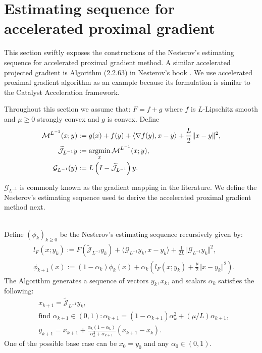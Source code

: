 \documentclass[12pt]{article}
\begin{document}
\section{Estimating sequence for accelerated proximal gradient}
    This section swiftly exposes the constructions of the Nesterov's estimating sequence for accelerated proximal gradient method. A similar accelerated projected gradient is Algorithm (2.2.63) in Nesterov's book \cite{nesterov_lectures_2018}. 
    We use accelerated proximal gradient algorithm as an example because its formulation is similar to the Catalyst Acceleration framework. 
    \par
    Throughout this section we assume that: $F = f + g$ where $f$ is $L$-Lipschitz smooth and $\mu \ge 0$ strongly convex and $g$ is convex. 
    Define 
    \begin{align*}
        \mathcal M^{L^{-1}}(x; y) 
        &:= g(x) + f(y) 
        + 
        \left\langle \nabla f(y), x - y\right\rangle 
        + 
        \frac{L}{2}\Vert x - y\Vert^2, 
        \\
        \widetilde{\mathcal J}_{L^{-1}}y 
        &:= \mathop{\rm argmin}\limits_{x} \mathcal M^{L^{-1}}(x; y), 
        \\
        \mathcal G_{L^{-1}}(y)
        &:= L\left(I - \widetilde{\mathcal J}_{L^{-1}}\right)y. 
    \end{align*}
    \par
    $\mathcal G_{L^{-1}}$ is commonly known as the gradient mapping in the literature. 
    We define the Nesterov's estimating sequence used to derive the accelerated proximal gradient method next. 
    \begin{definition}
    \label{def:nes-est-seq-pg}\;\\
        Define $(\phi_k)_{k \ge0}$ be the Nesterov's estimating sequence recursively given by: 
        \begin{align*}
            & l_F(x; y_k) := 
                F\left(\widetilde{\mathcal J}_{L^{-1}} y_k \right) 
                + \langle \mathcal G_{L^{-1}}y_k, x - y_k\rangle + 
            \frac{1}{2L}\Vert \mathcal G_{L^{-1}}y_k\Vert^2, 
            \\
            & 
            \phi_{k + 1}(x)
            := (1 - \alpha_k)\phi_k (x) + 
            \alpha_k 
            \left(
                l_F(x; y_k) + \frac{\mu}{2}\Vert x - y_k\Vert^2
            \right). 
        \end{align*}
        The Algorithm generates a sequence of vectors $y_k, x_k$, and scalars $\alpha_k$ satisfies the following: 
        \begin{align*}
            &x_{k + 1} = \widetilde{\mathcal J}_{L^{-1}} y_k, 
            \\
            & \text{find } \alpha_{k + 1} \in (0, 1): 
            \alpha_{k + 1} = (1 - \alpha_{k + 1})\alpha_k^{2} + (\mu/L) \alpha_{k + 1}, 
            \\
            &y_{k + 1} = x_{k + 1} + \frac{\alpha_k(1 - \alpha_k)}{\alpha_k^2 + \alpha_{k + 1}}(x_{k + 1} - x_k). 
        \end{align*}
        One of the possible base case can be $x_0 = y_0$ and any $\alpha_0 \in (0, 1)$. 
    \end{definition}
\end{document}
